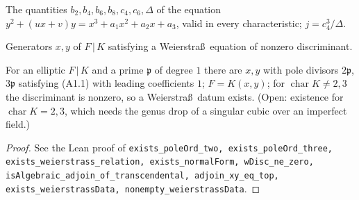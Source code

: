 \begin{definition}
\label{def:weierstrass-invariants}
\leanok
The quantities $b_2,b_4,b_6,b_8,c_4,c_6,\Delta$ of the equation $y^2+(ux+v)y=x^3+a_1x^2+a_2x+a_3$, valid in every characteristic; $j=c_4^3/\Delta$.
\end{definition}

\begin{definition}
\label{def:weierstrass-data}
\leanok
Generators $x,y$ of $F\,|\,K$ satisfying a Weierstra\ss\ equation of nonzero discriminant.
\end{definition}

\begin{theorem}
\label{thm:A-existence-eq}
\leanok
For an elliptic $F\,|\,K$ and a prime $\mathfrak p$ of degree $1$ there are $x,y$ with pole divisors $2\mathfrak p$, $3\mathfrak p$ satisfying (A1.1) with leading coefficients $1$; $F=K(x,y)$; for $\operatorname{char}K\neq 2,3$ the discriminant is nonzero, so a Weierstra\ss\ datum exists. (Open: existence for $\operatorname{char}K=2,3$, which needs the genus drop of a singular cubic over an imperfect field.)
\end{theorem}
\begin{proof}
\leanok
See the Lean proof of \texttt{exists\_poleOrd\_two, exists\_poleOrd\_three, exists\_weierstrass\_relation, exists\_normalForm, wDisc\_ne\_zero, isAlgebraic\_adjoin\_of\_transcendental, adjoin\_xy\_eq\_top, exists\_weierstrassData, nonempty\_weierstrassData}.
\end{proof}

